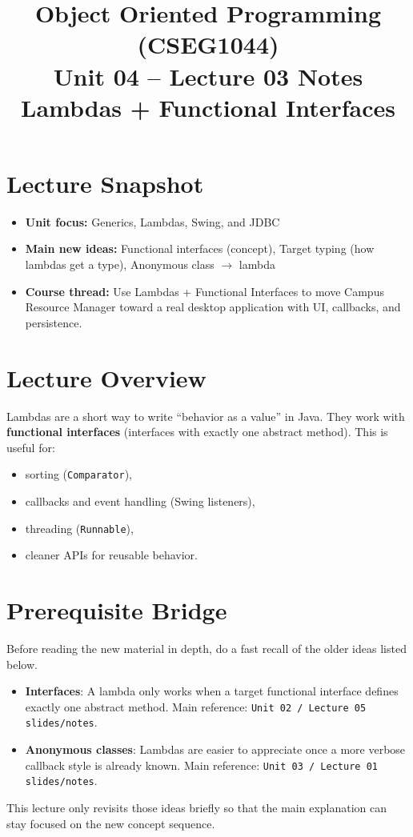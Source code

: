 \documentclass[11pt]{article}
\title{Object Oriented Programming (CSEG1044)\\Unit 04 -- Lecture 03 Notes\\Lambdas + Functional Interfaces}
\begin{document}
\maketitle
\tableofcontents

\section{Lecture Snapshot}
\begin{itemize}
  \item \textbf{Unit focus:} Generics, Lambdas, Swing, and JDBC
  \item \textbf{Main new ideas:} Functional interfaces (concept), Target typing (how lambdas get a type), \texorpdfstring{Anonymous class $\rightarrow$ lambda}{Anonymous class -> lambda}
  \item \textbf{Course thread:} Use Lambdas + Functional Interfaces to move Campus Resource Manager toward a real desktop application with UI, callbacks, and persistence.
\end{itemize}
\notesources{\OOPSUnitIVSources}

\section{Lecture Overview}
Lambdas are a short way to write ``behavior as a value'' in Java.
They work with \textbf{functional interfaces} (interfaces with exactly one abstract method).
This is useful for:
\begin{itemize}
  \item sorting (\texttt{Comparator}),
  \item callbacks and event handling (Swing listeners),
  \item threading (\texttt{Runnable}),
  \item cleaner APIs for reusable behavior.
\end{itemize}
\notesources{\OOPSUnitIVSources}

\section{Prerequisite Bridge}
Before reading the new material in depth, do a fast recall of the older ideas listed below.
\begin{itemize}
  \item \textbf{Interfaces}: A lambda only works when a target functional interface defines exactly one abstract method. Main reference: \texttt{Unit 02 / Lecture 05 slides/notes}.
  \item \textbf{Anonymous classes}: Lambdas are easier to appreciate once a more verbose callback style is already known. Main reference: \texttt{Unit 03 / Lecture 01 slides/notes}.
\end{itemize}
This lecture only revisits those ideas briefly so that the main explanation can stay focused on the new concept sequence.
\notesources{\OOPSUnitIVSources}
\end{document}

